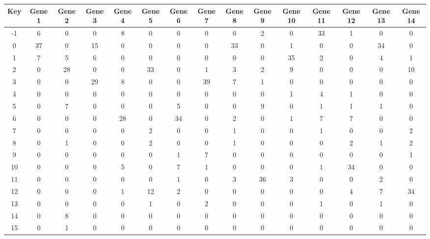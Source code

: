 \begin{tabular}{|c|c|c|c|c|c|c|c|c|c|c|c|c|c|c|}
\hline
Key & Gene 1 & Gene 2 & Gene 3 & Gene 4 & Gene 5 & Gene 6 & Gene 7 & Gene 8 & Gene 9 & Gene 10 & Gene 11 & Gene 12 & Gene 13 & Gene 14 \\
\hline
-1 & 6 & 0 & 0 & 8 & 0 & 0 & 0 & 0 & 2 & 0 & 33 & 1 & 0 & 0 \\
0 & 37 & 0 & 15 & 0 & 0 & 0 & 0 & 33 & 0 & 1 & 0 & 0 & 34 & 0 \\
1 & 7 & 5 & 6 & 0 & 0 & 0 & 0 & 0 & 0 & 35 & 2 & 0 & 4 & 1 \\
2 & 0 & 28 & 0 & 0 & 33 & 0 & 1 & 3 & 2 & 9 & 0 & 0 & 0 & 10 \\
3 & 0 & 0 & 29 & 8 & 0 & 0 & 39 & 7 & 1 & 0 & 0 & 0 & 0 & 0 \\
4 & 0 & 0 & 0 & 0 & 0 & 0 & 0 & 0 & 0 & 1 & 4 & 1 & 0 & 0 \\
5 & 0 & 7 & 0 & 0 & 0 & 5 & 0 & 0 & 9 & 0 & 1 & 1 & 1 & 0 \\
6 & 0 & 0 & 0 & 28 & 0 & 34 & 0 & 2 & 0 & 1 & 7 & 7 & 0 & 0 \\
7 & 0 & 0 & 0 & 0 & 2 & 0 & 0 & 1 & 0 & 0 & 1 & 0 & 0 & 2 \\
8 & 0 & 1 & 0 & 0 & 2 & 0 & 0 & 1 & 0 & 0 & 0 & 2 & 1 & 2 \\
9 & 0 & 0 & 0 & 0 & 0 & 1 & 7 & 0 & 0 & 0 & 0 & 0 & 0 & 1 \\
10 & 0 & 0 & 0 & 5 & 0 & 7 & 1 & 0 & 0 & 0 & 1 & 34 & 0 & 0 \\
11 & 0 & 0 & 0 & 0 & 0 & 1 & 0 & 3 & 36 & 3 & 0 & 0 & 2 & 0 \\
12 & 0 & 0 & 0 & 1 & 12 & 2 & 0 & 0 & 0 & 0 & 0 & 4 & 7 & 34 \\
13 & 0 & 0 & 0 & 0 & 1 & 0 & 2 & 0 & 0 & 0 & 1 & 0 & 1 & 0 \\
14 & 0 & 8 & 0 & 0 & 0 & 0 & 0 & 0 & 0 & 0 & 0 & 0 & 0 & 0 \\
15 & 0 & 1 & 0 & 0 & 0 & 0 & 0 & 0 & 0 & 0 & 0 & 0 & 0 & 0 \\
\hline
\end{tabular}